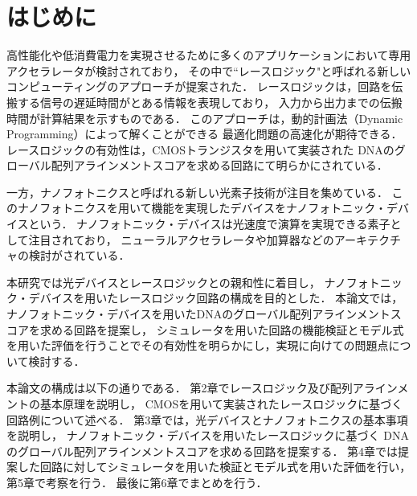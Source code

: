 \chapter{はじめに}
高性能化や低消費電力を実現させるために多くのアプリケーションにおいて専用アクセラレータが検討されており，
その中で``レースロジック"と呼ばれる新しいコンピューティングのアプローチが提案された\cite{madhavan2014race}．
レースロジックは，回路を伝搬する信号の遅延時間がとある情報を表現しており，
入力から出力までの伝搬時間が計算結果を示すものである．
このアプローチは，動的計画法（Dynamic Programming）によって解くことができる
最適化問題の高速化が期待できる．
レースロジックの有効性は，CMOSトランジスタを用いて実装された
DNAのグローバル配列アラインメントスコアを求める回路にて明らかにされている\cite{madhavan2014race,madhavan2015race,madhavan20174}．

一方，ナノフォトニクスと呼ばれる新しい光素子技術が注目を集めている．
このナノフォトニクスを用いて機能を実現したデバイスをナノフォトニック・デバイスという．
ナノフォトニック・デバイスは光速度で演算を実現できる素子として注目されており，
ニューラルアクセラレータや加算器などのアーキテクチャの検討がされている\cite{kawakami,shisobe,Ishihara2016opti}．

本研究では光デバイスとレースロジックとの親和性に着目し，
ナノフォトニック・デバイスを用いたレースロジック回路の構成を目的とした．
本論文では，ナノフォトニック・デバイスを用いたDNAのグローバル配列アラインメントスコアを求める回路を提案し，
シミュレータを用いた回路の機能検証とモデル式を用いた評価を行うことでその有効性を明らかにし，実現に向けての問題点について検討する．

本論文の構成は以下の通りである．
第2章でレースロジック及び配列アラインメントの基本原理を説明し，
CMOSを用いて実装されたレースロジックに基づく回路例について述べる．
第3章では，光デバイスとナノフォトニクスの基本事項を説明し，
ナノフォトニック・デバイスを用いたレースロジックに基づく
DNAのグローバル配列アラインメントスコアを求める回路を提案する．
第4章では提案した回路に対してシミュレータを用いた検証とモデル式を用いた評価を行い，第5章で考察を行う．
最後に第6章でまとめを行う．

